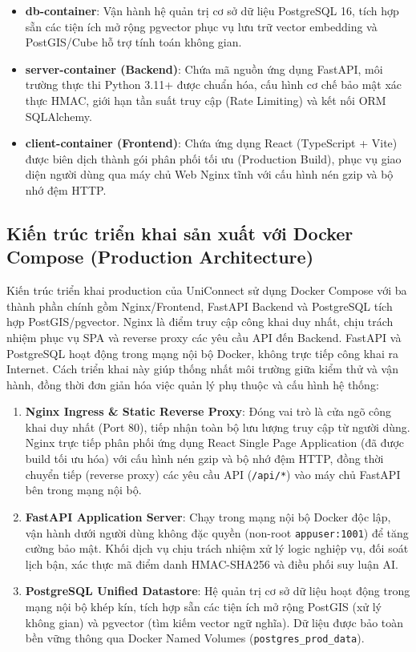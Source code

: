 \begin{itemize}
    \item \textbf{db-container}: Vận hành hệ quản trị cơ sở dữ liệu PostgreSQL 16, tích hợp sẵn các tiện ích mở rộng pgvector phục vụ lưu trữ vector embedding và PostGIS/Cube hỗ trợ tính toán không gian.

    \item \textbf{server-container (Backend)}: Chứa mã nguồn ứng dụng FastAPI, môi trường thực thi Python 3.11+ được chuẩn hóa, cấu hình cơ chế bảo mật xác thực HMAC, giới hạn tần suất truy cập (Rate Limiting) và kết nối ORM SQLAlchemy.
    
    \item \textbf{client-container (Frontend)}: Chứa ứng dụng React (TypeScript + Vite) được biên dịch thành gói phân phối tối ưu (Production Build), phục vụ giao diện người dùng qua máy chủ Web Nginx tĩnh với cấu hình nén gzip và bộ nhớ đệm HTTP.
\end{itemize}

\subsection{Kiến trúc triển khai sản xuất với Docker Compose (Production Architecture)}

Kiến trúc triển khai production của UniConnect sử dụng Docker Compose với ba thành phần chính gồm Nginx/Frontend, FastAPI Backend và PostgreSQL tích hợp PostGIS/pgvector. Nginx là điểm truy cập công khai duy nhất, chịu trách nhiệm phục vụ SPA và reverse proxy các yêu cầu API đến Backend. FastAPI và PostgreSQL hoạt động trong mạng nội bộ Docker, không trực tiếp công khai ra Internet. Cách triển khai này giúp thống nhất môi trường giữa kiểm thử và vận hành, đồng thời đơn giản hóa việc quản lý phụ thuộc và cấu hình hệ thống:

\begin{enumerate}
    \item \textbf{Nginx Ingress \& Static Reverse Proxy}: Đóng vai trò là cửa ngõ công khai duy nhất (Port 80), tiếp nhận toàn bộ lưu lượng truy cập từ người dùng. Nginx trực tiếp phân phối ứng dụng React Single Page Application (đã được build tối ưu hóa) với cấu hình nén gzip và bộ nhớ đệm HTTP, đồng thời chuyển tiếp (reverse proxy) các yêu cầu API (\texttt{/api/*}) vào máy chủ FastAPI bên trong mạng nội bộ.
    
    \item \textbf{FastAPI Application Server}: Chạy trong mạng nội bộ Docker độc lập, vận hành dưới người dùng không đặc quyền (non-root \texttt{appuser:1001}) để tăng cường bảo mật. Khối dịch vụ chịu trách nhiệm xử lý logic nghiệp vụ, đối soát lịch bận, xác thực mã điểm danh HMAC-SHA256 và điều phối suy luận AI.
    
    \item \textbf{PostgreSQL Unified Datastore}: Hệ quản trị cơ sở dữ liệu hoạt động trong mạng nội bộ khép kín, tích hợp sẵn các tiện ích mở rộng PostGIS (xử lý không gian) và pgvector (tìm kiếm vector ngữ nghĩa). Dữ liệu được bảo toàn bền vững thông qua Docker Named Volumes (\texttt{postgres\_prod\_data}).
\end{enumerate}

